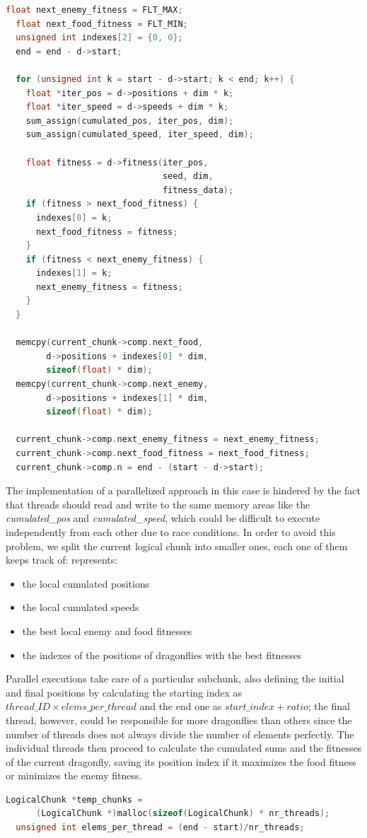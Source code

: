 \documentclass[10pt]{article}
\begin{document}
\begin{multicols}{2}
\begin{lstlisting}[language=C,caption={the serial version of \textit{computation\_accumulate}}]
  float next_enemy_fitness = FLT_MAX;
  float next_food_fitness = FLT_MIN;
  unsigned int indexes[2] = {0, 0};
  end = end - d->start;

  for (unsigned int k = start - d->start; k < end; k++) {
    float *iter_pos = d->positions + dim * k;
    float *iter_speed = d->speeds + dim * k;
    sum_assign(cumulated_pos, iter_pos, dim);
    sum_assign(cumulated_speed, iter_speed, dim);

    float fitness = d->fitness(iter_pos, 
                               seed, dim, 
                               fitness_data);
    if (fitness > next_food_fitness) {
      indexes[0] = k;
      next_food_fitness = fitness;
    }
    if (fitness < next_enemy_fitness) {
      indexes[1] = k;
      next_enemy_fitness = fitness;
    }
  }

  memcpy(current_chunk->comp.next_food, 
        d->positions + indexes[0] * dim,
        sizeof(float) * dim);
  memcpy(current_chunk->comp.next_enemy, 
        d->positions + indexes[1] * dim,
        sizeof(float) * dim);
      
  current_chunk->comp.next_enemy_fitness = next_enemy_fitness;
  current_chunk->comp.next_food_fitness = next_food_fitness;
  current_chunk->comp.n = end - (start - d->start);
\end{lstlisting}


The implementation of a parallelized approach in this case is hindered by the fact that 
threads should read and write to the same memory areas like the \textit{cumulated\_pos}
and \textit{cumulated\_speed}, which could be 
difficult to execute independently from each other due to race conditions. 
In order to avoid this problem, we split the current logical chunk into smaller ones, each
one of them keeps track of: 
represents:
\begin{itemize}
\item the local cumulated positions
\item the local cumulated speeds
\item the best local enemy and food fitnesses
\item the indexes of the positions of dragonflies with the best fitnesses
\end{itemize}
\noindent Parallel executions take care of a particular subchunk,
also defining the initial and final positions by
calculating the starting index as $thread\_ID \times elems\_per\_thread$ and the end one as $start\_index + ratio$; 
the final thread, however, could be responsible for more dragonflies 
than others since the number of threads does not always
divide the number of elements perfectly. The individual threads then proceed to 
calculate the cumulated sums and the fitnesses of the current dragonfly, 
saving its position index if it maximizes the food fitness or minimizes the 
enemy fitness. 
\begin{lstlisting}[language=C,caption={the parallel version of \textit{computation\_accumulate}}]
  LogicalChunk *temp_chunks =
      (LogicalChunk *)malloc(sizeof(LogicalChunk) * nr_threads);
  unsigned int elems_per_thread = (end - start)/nr_threads;


\end{lstlisting}
\end{multicols}
\end{document}
